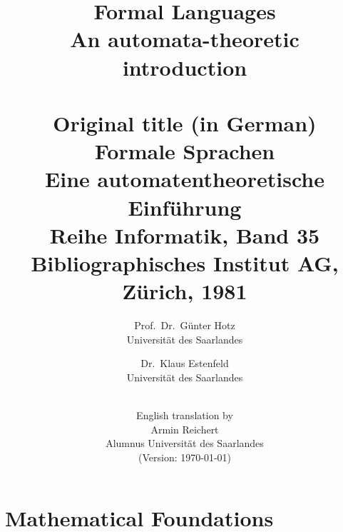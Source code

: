 \documentclass[a4paper]{amsbook}
\title{Formal Languages\\An automata-theoretic introduction\\
\ \\
Original title (in German)\\Formale Sprachen\\Eine automatentheoretische
Einführung\\
Reihe Informatik, Band 35\\
Bibliographisches Institut AG, Zürich, 1981}
\author{Prof.\ Dr.\ Günter Hotz\\Universität des Saarlandes
\and Dr.\ Klaus Estenfeld\\Universität des Saarlandes
\and \ \\English translation by\\Armin Reichert\\Alumnus Universität des
Saarlandes\\(Version: \today)}
\begin{document}
\maketitle
\tableofcontents


\chapter{Mathematical Foundations}
	
	
	
	
	
	
% 	
% 	
% 	
% 	
% 	
% 	
% 	
% 	
% 	
% 	
% 	
% 	
% 	
% 	
% 	
% 

\nocite{*}

\end{document}
